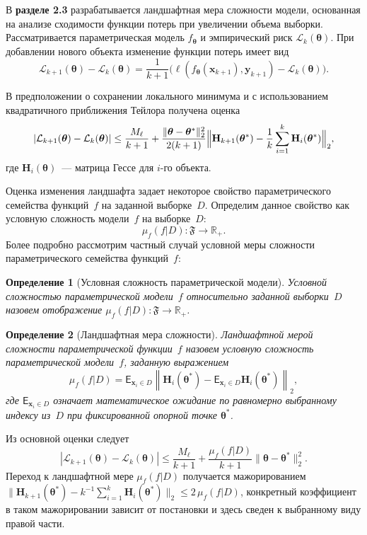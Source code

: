 \documentclass{dissert}
\newtheorem{definition}{Определение}
\begin{document}
В \textbf{разделе 2.3} разрабатывается ландшафтная мера сложности модели, основанная на анализе сходимости функции потерь при увеличении объема выборки.
Рассматривается параметрическая модель $f_{\boldsymbol\theta}$ и эмпирический риск $\mathcal{L}_k(\boldsymbol\theta)$.
При добавлении нового объекта изменение функции потерь имеет вид
\[
    \mathcal{L}_{k+1}(\boldsymbol\theta)-\mathcal{L}_k(\boldsymbol\theta)=\frac1{k+1}\bigl(\ell(f_{\boldsymbol\theta}(\mathbf{x}_{k+1}),\mathbf{y}_{k+1})-\mathcal{L}_k(\boldsymbol\theta)\bigr).
\]

В предположении о сохранении локального минимума и с использованием квадратичного приближения Тейлора получена оценка
\[
    |\mathcal{L}_{k+1}(\boldsymbol\theta)-\mathcal{L}_k(\boldsymbol\theta)|\le\frac{M_\ell}{k+1}+\frac{\|\boldsymbol\theta-\boldsymbol\theta^*\|_2^2}{2(k+1)}
    \Bigl\|\mathbf{H}_{k+1}(\boldsymbol\theta^*)-\frac1k\sum_{i=1}^k\mathbf{H}_i(\boldsymbol\theta^*)\Bigr\|_2,
\]
где $\mathbf{H}_i(\boldsymbol\theta)$~--- матрица Гессе для $i$-го объекта.

Оценка изменения ландшафта задает некоторое свойство параметрического семейства функций~$f$ на заданной выборке~$D$. Определим данное свойство как условную сложность модели~$f$ на выборке~$D$:
\[
    \mu_f(f|D) : \mathfrak{F} \to \mathbb{R}_+.
\]
Более подробно рассмотрим частный случай условной меры сложности параметрического семейства функций~$f$:
\begin{definition}[Условная сложность параметрической модели]
    Условной сложностью параметрической модели~$f$ относительно заданной выборки~$D$ назовем отображение $\mu_f(f|D):\mathfrak{F}\to\mathbb{R}_+$.
\end{definition}

\begin{definition}[Ландшафтная мера сложности]
    Ландшафтной мерой сложности параметрической функции~$f$ назовем условную сложность параметрической модели~$f$, заданную выражением
    \begin{equation}\label{ch1lc:eq:muf}
        \mu_f(f|D) = \mathsf{E}_{\mathbf{x}_i\in D}\left\| \mathbf{H}_{i}(\boldsymbol{\theta}^*) -  \mathsf{E}_{\mathbf{x}_i\in D}\mathbf{H}_{i}(\boldsymbol{\theta}^*) \right\|_2,
    \end{equation}
где $\mathsf{E}_{\mathbf{x}_i\in D}$ означает математическое ожидание по равномерно выбранному индексу из~$D$ при фиксированной опорной точке $\boldsymbol{\theta}^*$.
\end{definition}

Из основной оценки следует
\[
    |\mathcal{L}_{k+1}(\boldsymbol\theta)-\mathcal{L}_k(\boldsymbol\theta)|\le\frac{M_\ell}{k+1}+\frac{\mu_f(f|D)}{k+1}\|\boldsymbol\theta-\boldsymbol\theta^*\|_2^2.
\]
Переход к ландшафтной мере $\mu_f(f|D)$ получается мажорированием $\bigl\|\mathbf{H}_{k+1}(\boldsymbol\theta^*)-k^{-1}\sum_{i=1}^{k}\mathbf{H}_{i}(\boldsymbol\theta^*)\bigr\|_2 \leqslant 2\,\mu_f(f|D)$, конкретный коэффициент в таком мажорировании зависит от постановки и здесь сведен к выбранному виду правой части.
\end{document}
